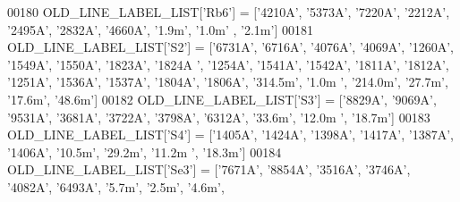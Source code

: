 \begin{DoxyCode}
{{00180 OLD\_LINE\_LABEL\_LIST[\textcolor{stringliteral}{'Rb6'}] = [\textcolor{stringliteral}{'4210A'}, \textcolor{stringliteral}{'5373A'}, \textcolor{stringliteral}{'7220A'}, \textcolor{stringliteral}{'2212A'}, \textcolor{stringliteral}{'2495A'}, \textcolor{stringliteral}{'2832A'}, \textcolor{stringliteral}{'4660A'}, \textcolor{stringliteral}{'1.9m'}, \textcolor{stringliteral}{'1.0m'}
      , \textcolor{stringliteral}{'2.1m'}]
00181 OLD\_LINE\_LABEL\_LIST[\textcolor{stringliteral}{'S2'}] = [\textcolor{stringliteral}{'6731A'}, \textcolor{stringliteral}{'6716A'}, \textcolor{stringliteral}{'4076A'}, \textcolor{stringliteral}{'4069A'}, \textcolor{stringliteral}{'1260A'}, \textcolor{stringliteral}{'1549A'}, \textcolor{stringliteral}{'1550A'}, \textcolor{stringliteral}{'1823A'}, \textcolor{stringliteral}{'1824A
      '}, \textcolor{stringliteral}{'1254A'}, \textcolor{stringliteral}{'1541A'}, \textcolor{stringliteral}{'1542A'}, \textcolor{stringliteral}{'1811A'}, \textcolor{stringliteral}{'1812A'}, \textcolor{stringliteral}{'1251A'}, \textcolor{stringliteral}{'1536A'}, \textcolor{stringliteral}{'1537A'}, \textcolor{stringliteral}{'1804A'}, \textcolor{stringliteral}{'1806A'}, \textcolor{stringliteral}{'314.5m'}, \textcolor{stringliteral}{'1.0m
      '}, \textcolor{stringliteral}{'214.0m'}, \textcolor{stringliteral}{'27.7m'}, \textcolor{stringliteral}{'17.6m'}, \textcolor{stringliteral}{'48.6m'}]
00182 OLD\_LINE\_LABEL\_LIST[\textcolor{stringliteral}{'S3'}] = [\textcolor{stringliteral}{'8829A'}, \textcolor{stringliteral}{'9069A'}, \textcolor{stringliteral}{'9531A'}, \textcolor{stringliteral}{'3681A'}, \textcolor{stringliteral}{'3722A'}, \textcolor{stringliteral}{'3798A'}, \textcolor{stringliteral}{'6312A'}, \textcolor{stringliteral}{'33.6m'}, \textcolor{stringliteral}{'12.0m
      '}, \textcolor{stringliteral}{'18.7m'}]
00183 OLD\_LINE\_LABEL\_LIST[\textcolor{stringliteral}{'S4'}] = [\textcolor{stringliteral}{'1405A'}, \textcolor{stringliteral}{'1424A'}, \textcolor{stringliteral}{'1398A'}, \textcolor{stringliteral}{'1417A'}, \textcolor{stringliteral}{'1387A'}, \textcolor{stringliteral}{'1406A'}, \textcolor{stringliteral}{'10.5m'}, \textcolor{stringliteral}{'29.2m'}, \textcolor{stringliteral}{'11.2m
      '}, \textcolor{stringliteral}{'18.3m'}]
00184 OLD\_LINE\_LABEL\_LIST[\textcolor{stringliteral}{'Se3'}] = [\textcolor{stringliteral}{'7671A'}, \textcolor{stringliteral}{'8854A'}, \textcolor{stringliteral}{'3516A'}, \textcolor{stringliteral}{'3746A'}, \textcolor{stringliteral}{'4082A'}, \textcolor{stringliteral}{'6493A'}, \textcolor{stringliteral}{'5.7m'}, \textcolor{stringliteral}{'2.5m'}, \textcolor{stringliteral}{'4.6m'},
}}
\end{DoxyCode}
